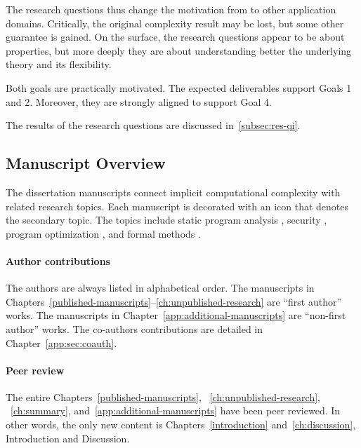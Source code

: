 The research questions thus change the motivation from 
to other application domains. Critically, the original complexity result may be
lost, but some other guarantee is gained. On the surface, the research questions
appear to be about properties, but more deeply they are about understanding
better the underlying theory and its flexibility.

Both goals are practically motivated. The expected deliverables support Goals
1 and 2. Moreover, they are strongly aligned to support Goal 4.

The results of the research questions are discussed in~\autoref{subsec:res-qi}.

\subsection{Manuscript Overview}
\label{ssec:manuscripts}

The dissertation manuscripts connect implicit computational complexity with
related research topics. Each manuscript is decorated with an icon that denotes
the secondary topic. The topics include static program analysis \iconSPA,
security \iconSEC, program optimization \iconOPT, and formal methods \iconFM.


\paragraph*{Author contributions}
The authors are always listed in alphabetical order. The manuscripts in
Chapters~\autoref{published-manuscripts}--\autoref{ch:unpublished-research} are
\enquote{first author} works. The manuscripts in
Chapter~\autoref{app:additional-manuscripts} are \enquote{non-first author}
works. The co-authors contributions are detailed in
Chapter~\autoref{app:sec:coauth}.

\paragraph*{Peer review}
The entire Chapters~\autoref{published-manuscripts},
~\autoref{ch:unpublished-research}, ~\autoref{ch:summary},
and~\autoref{app:additional-manuscripts} have been peer reviewed. In other
words, the only new content is Chapters~\autoref{introduction}
and~\autoref{ch:discussion}, \ie Introduction and Discussion.

